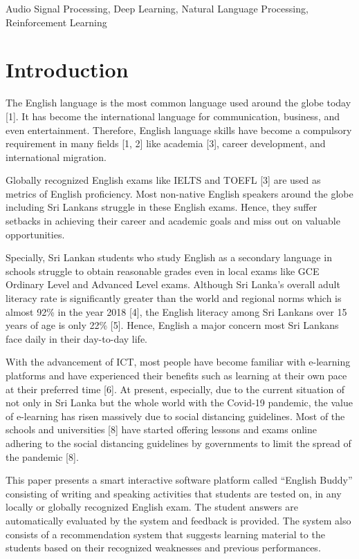 \documentclass[conference]{IEEEtran}
\begin{document}
\begin{IEEEkeywords}
Audio Signal Processing, Deep Learning, Natural Language Processing, Reinforcement Learning
\end{IEEEkeywords}

\section{Introduction}

The English language is the most common language used around the globe today [1]. It has become the international language for communication, business, and even entertainment. Therefore, English language skills have become a compulsory requirement in many fields [1, 2] like academia [3], career development, and international migration.

Globally recognized English exams like IELTS and TOEFL [3] are used as metrics of English proficiency. Most non-native English speakers around the globe including Sri Lankans struggle in these English exams. Hence, they suffer setbacks in achieving their career and academic goals and miss out on valuable opportunities.

Specially, Sri Lankan students who study English as a secondary language in schools struggle to obtain reasonable grades even in local exams like GCE Ordinary Level and Advanced Level exams. Although Sri Lanka's overall adult literacy rate is significantly greater than the world and regional norms which is almost 92\% in the year 2018 [4], the English literacy among Sri Lankans over 15 years of age is only 22\% [5]. Hence, English a major concern most Sri Lankans face daily in their day-to-day life.

With the advancement of ICT, most people have become familiar with e-learning platforms and have experienced their benefits such as learning at their own pace at their preferred time [6]. At present, especially, due to the current situation of not only in Sri Lanka but the whole world with the Covid-19 pandemic, the value of e-learning has risen massively due to social distancing guidelines. Most of the schools and universities [8] have started offering lessons and exams online adhering to the social distancing guidelines by governments to limit the spread of the pandemic [8].

This paper presents a smart interactive software platform called ``English Buddy'' consisting of writing and speaking activities that students are tested on, in any locally or globally recognized English exam. The student answers are automatically evaluated by the system and feedback is provided. The system also consists of a recommendation system that suggests learning material to the students based on their recognized weaknesses and previous performances.
\end{document}
